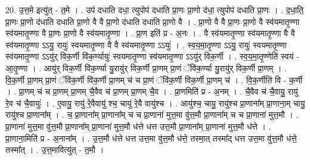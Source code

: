 \documentclass[17pt]{extarticle}
\begin{document}
20. उ॒त्त॒मे इत्यु॑त् - त॒मे । . उप॑ दधाति दधा॒ त्युपोप॑ दधाति प्रा॒णः प्रा॒णो द॑धा॒ त्युपोप॑ दधाति प्रा॒णः । . द॒धा॒ति॒ प्रा॒णः प्रा॒णो द॑धाति दधाति प्रा॒णो वै वै प्रा॒णो द॑धाति दधाति प्रा॒णो वै । . प्रा॒णो वै वै प्रा॒णः प्रा॒णो वै स्व॑यमातृ॒ण्णा स्व॑यमातृ॒ण्णा वै प्रा॒णः प्रा॒णो वै स्व॑यमातृ॒ण्णा । . प्रा॒ण इति॑ प्र - अ॒नः । . वै स्व॑यमातृ॒ण्णा स्व॑यमातृ॒ण्णा वै वै स्व॑यमातृ॒ण्णा ऽऽयु॒ रायुः॑ स्वयमातृ॒ण्णा वै वै स्व॑यमातृ॒ण्णा ऽऽयुः॑ । . स्व॒य॒मा॒तृ॒ण्णा ऽऽयु॒ रायुः॑ स्वयमातृ॒ण्णा स्व॑यमातृ॒ण्णा ऽऽयु॑र् विक॒र्णी वि॑क॒र्ण्यायुः॑ स्वयमातृ॒ण्णा स्व॑यमातृ॒ण्णा ऽऽयु॑र् विक॒र्णी । . स्व॒य॒मा॒तृ॒ण्णेति॑ स्वयं - आ॒तृ॒ण्णा । . आयु॑र् विक॒र्णी वि॑क॒र्ण्या यु॒रायु॑र् विक॒र्णी प्रा॒णम् प्रा॒णं ॅवि॑क॒र्ण्या यु॒रायु॑र् विक॒र्णी प्रा॒णम् । . वि॒क॒र्णी प्रा॒णम् प्रा॒णं ॅवि॑क॒र्णी वि॑क॒र्णी प्रा॒णम् च॑ च प्रा॒णं ॅवि॑क॒र्णी वि॑क॒र्णी प्रा॒णम् च॑ । . वि॒क॒र्णीति॑ वि - क॒र्णी । . प्रा॒णम् च॑ च प्रा॒णम् प्रा॒णम् चै॒वैव च॑ प्रा॒णम् प्रा॒णम् चै॒व । . प्रा॒णमिति॑ प्र - अ॒नम् । . चै॒वैव च॑ चै॒वायु॒ रायु॑ रे॒व च॑ चै॒वायुः॑ । . ए॒वायु॒ रायु॑ रे॒वैवायु॑ श्च॒ चायु॑ रे॒वै वायु॑श्च । . आयु॑श्च॒ चायु॒ रायु॑श्च प्रा॒णाना᳚म् प्रा॒णाना॒म् चायु॒ रायु॑श्च प्रा॒णाना᳚म् । . च॒ प्रा॒णाना᳚म् प्रा॒णाना᳚म् च च प्रा॒णाना॑ मुत्त॒मा वु॑त्त॒मौ प्रा॒णाना᳚म् च च प्रा॒णाना॑ मुत्त॒मौ । . प्रा॒णाना॑ मुत्त॒मा वु॑त्त॒मौ प्रा॒णाना᳚म् प्रा॒णाना॑ मुत्त॒मौ ध॑त्ते धत्त उत्त॒मौ प्रा॒णाना᳚म् प्रा॒णाना॑ मुत्त॒मौ ध॑त्ते । . प्रा॒णाना॒मिति॑ प्र - अ॒नाना᳚म् । . उ॒त्त॒मौ ध॑त्ते धत्त उत्त॒मा वु॑त्त॒मौ ध॑त्ते॒ तस्मा॒त् तस्मा᳚द् धत्त उत्त॒मा वु॑त्त॒मौ ध॑त्ते॒ तस्मा᳚त् । . उ॒त्त॒मावित्यु॑त् - त॒मौ । \newline
\end{document}
